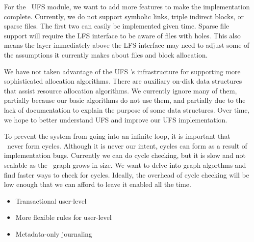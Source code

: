 For the \Kudos\ UFS module, we want to add more features to make the
implementation complete. Currently, we do not support symbolic links, triple
indirect blocks, or sparse files. The first two can easily be implemented
given time. Sparse file support will require the LFS interface to be aware of
files with holes. This also means the layer immediately above the LFS interface
may need to adjust some of the assumptions it currently makes about files and
block allocation.

We have not taken advantage of the UFS \module's infrastructure for supporting
more sophisticated allocation algorithms. There are auxiliary on-disk data
structures that assist resource allocation algorithms. We currently ignore many
of them, partially because our basic algorithms do not use them, and partially
due to the lack of documentation to explain the purpose of some data
structures. Over time, we hope to better understand UFS and improve our UFS
implementation.

To prevent the system from going into an infinite loop, it is important that
\chdescs\ never form cycles. Although it is never our intent, cycles can form
as a result of implementation bugs. Currently we can do cycle checking, but it
is slow and not scalable as the \chdesc\ graph grows in size. We want to delve
into graph algorthms and find faster ways to check for cycles. Ideally, the
overhead of cycle checking will be low enough that we can afford to leave it
enabled all the time.

\begin{itemize}
\item Transactional user-level \chdescs
\item More flexible rules for user-level \chdescs
\item Metadata-only journaling
\end{itemize}

